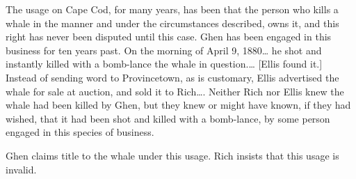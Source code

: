 The usage on Cape Cod, for many years, has been that the person who kills a
whale in the manner and under the circumstances described, owns it, and this
right has never been disputed until this case. Ghen has been engaged in
this business for ten years past. On the morning of April 9, 1880\ldots
he shot and instantly killed with a bomb-lance the whale in question.\ldots
[Ellis found it.] Instead of
sending word to Provincetown, as is customary, Ellis advertised the whale for
sale at auction, and sold it to Rich\ldots.
Neither Rich nor Ellis knew the whale had been killed
by Ghen, but they knew or might have known, if they had wished, that it
had been shot and killed with a bomb-lance, by some person engaged in this
species of business.

Ghen claims title to the whale under this usage. Rich insists
that this usage is invalid.

